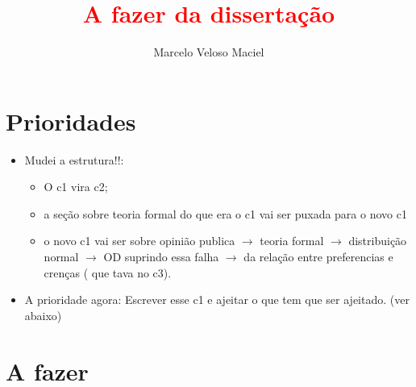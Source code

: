 \documentclass{article}
\title{\textcolor{red}{A fazer da dissertação}}
\author{Marcelo Veloso Maciel}
\date{}
\begin{document}
\pagecolor{base03}
\color{base1}



\maketitle

\section*{Prioridades}

\begin{itemize}
\item  {\Large Mudei a estrutura!!}:
  \begin{itemize}
  \item O c1 vira c2;
  \item a seção sobre teoria formal do que era o c1 vai ser puxada para o novo
    c1
  \item o novo c1 vai ser sobre opinião publica $\rightarrow$ teoria formal $\rightarrow$
    distribuição normal $\rightarrow$ OD suprindo essa falha $\rightarrow$ da relação entre
    preferencias e crenças ( que tava no c3). 
  \end{itemize}
  \item {\Large A prioridade agora: Escrever esse c1 e ajeitar o que tem que ser
    ajeitado. (ver abaixo)}
\end{itemize}

\section*{A fazer}
\end{document}
